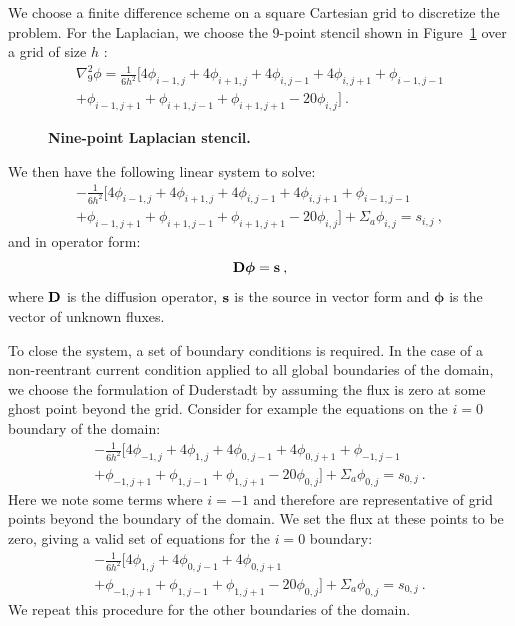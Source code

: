 \documentclass[letterpaper,12pt]{article}
\begin{document}
We choose a finite difference scheme on a square Cartesian grid to
discretize the problem. For the Laplacian, we choose the 9-point
stencil shown in Figure~\ref{fig:stencil} over a grid of size $h$
\cite{leveque_finite_2007}:
\begin{multline}
  \nabla^2_9\phi = \frac{1}{6h^2}[4 \phi_{i-1,j} + 4 \phi_{i+1,j}
    + 4 \phi_{i,j-1} + 4 \phi_{i,j+1} + \phi_{i-1,j-1}\\ +
    \phi_{i-1,j+1} + \phi_{i+1,j-1} + \phi_{i+1,j+1} - 20
    \phi_{i,j}]\:.
  \label{eq:nine_point_stencil}
\end{multline}
\begin{figure}[t!]
  \begin{center}
    \scalebox{1.25}{}
  \end{center}
  \caption{\textbf{Nine-point Laplacian stencil.}}
  \label{fig:stencil}
\end{figure}
We then have the following linear system to solve:
\begin{multline}
  -\frac{1}{6h^2}[4 \phi_{i-1,j} + 4 \phi_{i+1,j} + 4
    \phi_{i,j-1} + 4 \phi_{i,j+1} + \phi_{i-1,j-1}\\ + \phi_{i-1,j+1}
    + \phi_{i+1,j-1} + \phi_{i+1,j+1} - 20 \phi_{i,j}] + \Sigma_a
  \phi_{i,j} = s_{i,j}\:,
  \label{eq:fd_system}
\end{multline}
and in operator form:
\begin{equation}
  \mathbf{D}\boldsymbol{\phi}=\mathbf{s}\:,
  \label{eq:operator_system}
\end{equation}
where $\mathbf{D}$ is the diffusion operator, $\mathbf{s}$ is the source in
vector form and $\boldsymbol{\phi}$ is the vector of unknown fluxes.

To close the system, a set of boundary conditions is required. In the
case of a non-reentrant current condition applied to all global
boundaries of the domain, we choose the formulation of Duderstadt by
assuming the flux is zero at some ghost point beyond the
grid. Consider for example the equations on the $i=0$ boundary of the
domain:
\begin{multline}
  -\frac{1}{6h^2}[4 \phi_{-1,j} + 4 \phi_{1,j} + 4 \phi_{0,j-1} +
    4 \phi_{0,j+1} + \phi_{-1,j-1}\\ + \phi_{-1,j+1} + \phi_{1,j-1} +
    \phi_{1,j+1} - 20 \phi_{0,j}] + \Sigma_a \phi_{0,j} = s_{0,j}\:.
  \label{eq:x_min_bnd}
\end{multline}
Here we note some terms where $i=-1$ and therefore are representative
of grid points beyond the boundary of the domain. We set the flux at
these points to be zero, giving a valid set of equations for the $i=0$
boundary:
\begin{multline}
  -\frac{1}{6h^2}[4 \phi_{1,j} + 4 \phi_{0,j-1} + 4 \phi_{0,j+1}
    \\ + \phi_{-1,j+1} + \phi_{1,j-1} + \phi_{1,j+1} - 20 \phi_{0,j}]
  + \Sigma_a \phi_{0,j} = s_{0,j}\:.
  \label{eq:x_min_bnd_2}
\end{multline}
We repeat this procedure for the other boundaries of the domain.
\end{document}
